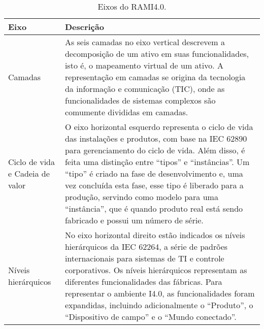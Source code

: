 \begin{table}[htb]
	\centering
	\footnotesize
	\begin{tabular}{p{3cm}p{12cm}}
		\hline
		\textbf{Eixo} & \textbf{Descrição}                                                                                                                                                                                                                                                                                                                                                                                                                                              \\

		\hline
		Camadas
		              & As seis camadas no eixo vertical descrevem a decomposição de um ativo em suas funcionalidades, isto é, o mapeamento virtual de um ativo. A representação em camadas se origina da tecnologia da informação e comunicação (TIC), onde as funcionalidades de sistemas complexos são comumente divididas em camadas.                                                                                                                                               \\

		\hline
		Ciclo de vida e  Cadeia de valor
		              & O eixo horizontal esquerdo representa o ciclo de vida das instalações e produtos, com base na IEC 62890 para gerenciamento do ciclo de vida. Além disso, é feita uma distinção entre ``tipos'' e ``instâncias''. Um ``tipo'' é criado na fase de desenvolvimento e, uma vez concluída esta fase, esse tipo é liberado para a produção, servindo como modelo para uma ``instância'', que é quando produto real está sendo fabricado e possui um número de série. \\

		\hline
		Níveis hierárquicos
		              & No eixo horizontal direito estão indicados os níveis hierárquicos da IEC 62264, a série de padrões internacionais para sistemas de TI e controle corporativos. Os níveis hierárquicos representam as diferentes funcionalidades das fábricas. Para representar o ambiente I4.0, as funcionalidades foram expandidas, incluindo adicionalmente o ``Produto'', o ``Dispositivo de campo'' e o ``Mundo conectado''.                                                \\
		\hline
	\end{tabular}
	\caption{Eixos do RAMI4.0.}
	\label{tab:rami-eixos}
\end{table}

